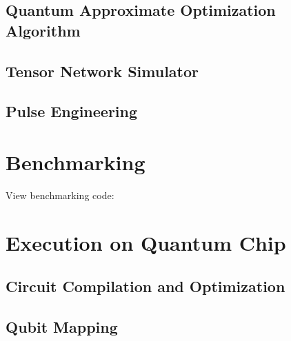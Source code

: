 \documentclass[pra,twocolumn,superscriptaddress,floatfix,nofootinbib,amsmath,amssymb]{revtex4-1}
\numberwithin{equation}{section}
\numberwithin{figure}{section}
\numberwithin{table}{section}
\begin{document}
\subsection{Quantum Approximate Optimization Algorithm}


\subsection{Tensor Network Simulator}


\subsection{Pulse Engineering}



\section{Benchmarking}
\label{sec:benchmark}

View benchmarking code: \href{https://gitee.com/mindspore/mindquantum/blob/research/whitepaper/code/benchmark}{\color{ceruleanblue}{CPU}} \href{https://gitee.com/mindspore/mindquantum/blob/research/whitepaper/code/benchmark_gpu}{\color{ceruleanblue}{GPU}}




\section{Execution on Quantum Chip}
\label{sec:chip}
\subsection{Circuit Compilation and Optimization}


\subsection{Qubit Mapping}


% 

% 
\end{document}
